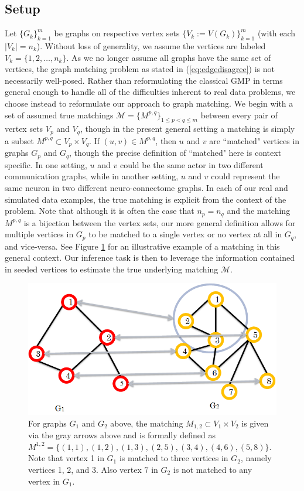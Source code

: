 \documentclass[12pt]{article}
\numberwithin{equation}{section}
\theoremstyle{definition}
\begin{document}
\subsection{Setup}
\label{S:pf}
Let $\{G_k\}_{k=1}^{m}$ be graphs on respective vertex sets $\{V_k:=V(G_k)\}_{k=1}^{m}$ (with each $|V_k|=n_k$).  Without loss of generality, we assume the vertices are labeled $V_k=\{1,2,\ldots,n_k\}$.  As we no longer assume all graphs have the same set of vertices, the graph matching problem as stated in (\ref{eq:edgedisagree}) is not necessarily well-posed.
Rather than reformulating the classical GMP in terms general enough to handle all of the difficulties inherent to real data problems, we choose instead to reformulate our approach to graph matching.
We begin with a set of assumed true matchings $\mathcal{M}=\{M^{p,q}\}_{1 \leq p < q \leq m}$ between every pair of vertex sets $V_p$ and $V_q$, though in the present general setting a matching is simply a subset $M^{p,q}\subset V_p\times V_q$.
If $(u,v)\in M^{p,q}$, then $u$ and $v$ are ``matched" vertices in
graphs $G_p$ and $G_q$, though the precise definition of ``matched" here
is context specific.  In one setting, $u$ and $v$ could be the same
actor in two different communication graphs, while in another setting, $u$
and $v$ could represent the same neuron in two different
neuro-connectome graphs.  In each of our real and simulated data
examples, the true matching is explicit from the context of the
problem.
 Note that although it is often the case that $n_p=n_q$ and
the matching $M^{p,q}$ is a bijection between the vertex sets, our more
general definition allows for multiple vertices in $G_p$ to be matched
to a single vertex or no vertex at all in $G_q$, and vice-versa.  See
Figure \ref{fig:fig1} for an illustrative example of a matching in this
general context.
 Our inference task is then to leverage the
information contained in seeded vertices to estimate the true underlying
matching $\mathcal{M}$.


\begin{figure}
\hspace{10mm}
\centering
\includegraphics[width=.7\textwidth]{matchingexample.png}
\caption{For graphs $G_1$ and $G_2$ above, the matching $M_{1,2} \subset V_1\times V_2$ is given via the gray arrows above and is formally defined as
$ M^{1,2} = \{(1,1),(1,2),(1,3),(2,5),(3,4),(4,6),(5,8)\} .$
Note that vertex 1 in $G_1$ is matched to three vertices in $G_2$, namely vertices 1, 2, and 3.  Also vertex $7$ in $G_2$ is not matched to any vertex in $G_1$.}
\label{fig:fig1}
\end{figure}
\end{document}
